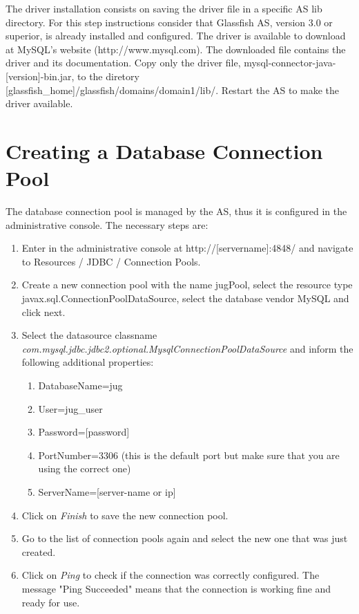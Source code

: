 \documentclass[envcountsame,envcountchap]{svmono}
\begin{document}
The driver installation consists on saving the driver file in a specific AS lib directory. For this step instructions consider that Glassfish AS, version 3.0 or superior, is already installed and configured. The driver is available to download at MySQL's website (http://www.mysql.com). The downloaded file contains the driver and its documentation. Copy only the driver file, mysql-connector-java-[version]-bin.jar, to the diretory [glassfish\_home]/glassfish/domains/domain1/lib/. Restart the AS to make the driver available.

\section{Creating a Database Connection Pool}
\label{sec:creating-database-connection-pool}

The database connection pool is managed by the AS, thus it is configured in the administrative console. The necessary steps are:

\begin{enumerate}
\item  Enter in the administrative console at http://[servername]:4848/ and navigate to Resources / JDBC / Connection Pools.
\item Create a new connection pool with the name jugPool, select the resource type javax.sql.ConnectionPoolDataSource, select the database vendor MySQL and click next.
\item Select the datasource classname \\ \textit{com.mysql.jdbc.jdbc2.optional.MysqlConnectionPoolDataSource} and inform the following additional properties:
   \begin{enumerate}
   \item DatabaseName=jug
   \item User=jug\_user
   \item Password=[password]
   \item PortNumber=3306 (this is the default port but make sure
   that you are using the correct one)
   \item ServerName=[server-name or ip]
   \end{enumerate}
\item Click on \textit{Finish} to save the new connection pool.
\item Go to the list of connection pools again and select the new one that was just created.
\item Click on \textit{Ping} to check if the connection was correctly configured. The message "Ping Succeeded" means that the connection is working fine and ready for use.
\end{enumerate}
\end{document}
